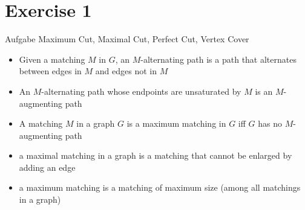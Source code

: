 
\section{Exercise 1}

\setcounter{exercise}{1}

\begin{frame}[allowframebreaks]{Aufgabe \thesection}{Maximum Cut, Maximal Cut, Perfect Cut, Vertex Cover}
  \begin{solution}
  \end{solution}
  \begin{requirementsnoinc}
    \begin{itemize}
      \item Given a matching $M$ in $G$, an \alert{$M$-alternating path} is a path that alternates between edges in $M$ and edges not in $M$
      \item An $M$-alternating path whose endpoints are unsaturated by $M$ is an \alert{$M$-augmenting path}
      \item  A matching $M$ in a graph $G$ is a \alert{maximum matching} in $G$ \alert{iff} $G$ has \alert{no $M$-augmenting path}
      \item a \alert{maximal matching} in a graph is a matching that cannot be enlarged by adding an edge
      \item a \alert{maximum matching} is a matching of maximum size (among all matchings in a graph)
    \end{itemize}
  \end{requirementsnoinc}
  \begin{solution}
  \end{solution}
  \begin{solution}
  \end{solution}
  \begin{solutionnoinc}
    \begin{columns}
      \begin{column}{0.5\textwidth}
      \end{column}
      \begin{column}{0.5\textwidth}
      \end{column}
    \end{columns}
  \end{solutionnoinc}

\end{frame}
